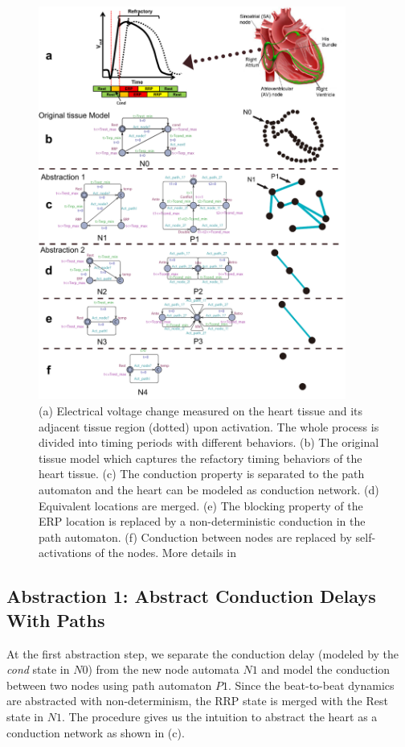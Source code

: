 \begin{figure}[!t]
\center
\includegraphics[width=0.9\textwidth]{figs/Heart_abs.pdf}
\caption{(a) Electrical voltage change measured on the heart tissue and its adjacent tissue region (dotted) upon activation. The whole process is divided into timing periods with different behaviors. (b) The original tissue model which captures the refactory timing behaviors of the heart tissue. (c) The conduction property is separated to the path automaton and the heart can be modeled as conduction network. (d) Equivalent locations are merged. (e) The blocking property of the ERP location is replaced by a non-deterministic conduction in the path automaton. (f) Conduction between nodes are replaced by self-activations of the nodes. More details in \cite{STTT13}}
\label{fig:HM_abs}
\end{figure} 
\subsection{Abstraction 1: Abstract Conduction Delays With Paths}
At the first abstraction step, we separate the conduction delay (modeled by the \emph{cond} state in $N0$) from the new node automata $N1$ and model the conduction between two nodes using path automaton $P1$. Since the beat-to-beat dynamics are abstracted with non-determinism, the RRP state is merged with the Rest state in $N1$. The procedure gives us the intuition to abstract the heart as a conduction network as shown in  (c). 

